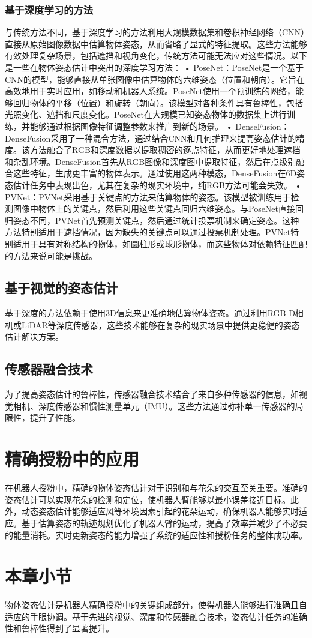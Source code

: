 \subsubsection{基于深度学习的方法}
与传统方法不同，基于深度学习的方法利用大规模数据集和卷积神经网络（CNN）直接从原始图像数据中估算物体姿态，从而省略了显式的特征提取。这些方法能够有效处理复杂场景，包括遮挡和视角变化，传统方法可能无法应对这些情况。以下是一些在物体姿态估计中突出的深度学习方法：
•	PoseNet：PoseNet是一个基于CNN的模型，能够直接从单张图像中估算物体的六维姿态（位置和朝向）。它旨在高效地用于实时应用，如移动和机器人系统。PoseNet使用一个预训练的网络，能够回归物体的平移（位置）和旋转（朝向）。该模型对各种条件具有鲁棒性，包括光照变化、遮挡和尺度变化。PoseNet在大规模已知姿态物体的数据集上进行训练，并能够通过根据图像特征调整参数来推广到新的场景。
•	DenseFusion：DenseFusion采用了一种混合方法，通过结合CNN和几何推理来提高姿态估计的精度。该方法融合了RGB和深度数据以提取稠密的逐点特征，从而更好地处理遮挡和杂乱环境。DenseFusion首先从RGB图像和深度图中提取特征，然后在点级别融合这些特征，生成更丰富的物体表示。通过使用这两种模态，DenseFusion在6D姿态估计任务中表现出色，尤其在复杂的现实环境中，纯RGB方法可能会失效。
•	PVNet：PVNet采用基于关键点的方法来估算物体的姿态。该模型被训练用于检测图像中物体上的关键点，然后利用这些关键点回归六维姿态。与PoseNet直接回归姿态不同，PVNet首先预测关键点，然后通过统计投票机制来确定姿态。这种方法特别适用于遮挡情况，因为缺失的关键点可以通过投票机制处理。PVNet特别适用于具有对称结构的物体，如圆柱形或球形物体，而这些物体对依赖特征匹配的方法来说可能是挑战。
\subsection{基于视觉的姿态估计}
基于深度的方法依赖于使用3D信息来更准确地估算物体姿态。通过利用RGB-D相机或LiDAR等深度传感器，这些技术能够在复杂的现实场景中提供更稳健的姿态估计解决方案。
\subsection{传感器融合技术}
为了提高姿态估计的鲁棒性，传感器融合技术结合了来自多种传感器的信息，如视觉相机、深度传感器和惯性测量单元（IMU）。这些方法通过弥补单一传感器的局限性，提升了性能。
\section{精确授粉中的应用}
在机器人授粉中，精确的物体姿态估计对于识别和与花朵的交互至关重要。准确的姿态估计可以实现花朵的检测和定位，使机器人臂能够以最小误差接近目标。此外，动态姿态估计能够适应风等环境因素引起的花朵运动，确保机器人能够实时适应。基于估算姿态的轨迹规划优化了机器人臂的运动，提高了效率并减少了不必要的能量消耗。实时更新姿态的能力增强了系统的适应性和授粉任务的整体成功率。
\section{本章小节}
物体姿态估计是机器人精确授粉中的关键组成部分，使得机器人能够进行准确且自适应的手眼协调。基于先进的视觉、深度和传感器融合技术，姿态估计任务的准确性和鲁棒性得到了显著提升。